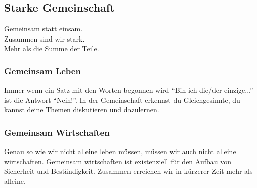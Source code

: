 {    \subsection{Starke Gemeinschaft}
Gemeinsam statt einsam.\\
Zusammen sind wir stark.\\
Mehr als die Summe der Teile.\\
      \subsubsection{Gemeinsam Leben}
Immer wenn ein Satz mit den Worten begonnen wird "`Bin ich die/der einzige..."' ist die Antwort "`Nein!"'.
%
In der Gemeinschaft erkennst du Gleichgesinnte, du kannst deine Themen diskutieren und dazulernen.
      \subsubsection{Gemeinsam Wirtschaften}
Genau so wie wir nicht alleine leben müssen, müssen wir auch nicht alleine wirtschaften.
%
Gemeinsam wirtschaften ist existenziell für den Aufbau von Sicherheit und Beständigkeit.
%
Zusammen erreichen wir in kürzerer Zeit mehr als alleine.
 
}
